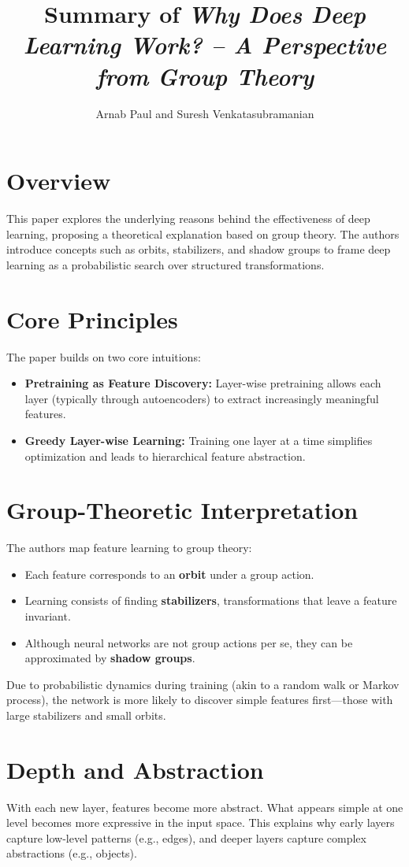 \documentclass[12pt]{article}
\title{Summary of \textit{Why Does Deep Learning Work? – A Perspective from Group Theory}}
\author{Arnab Paul and Suresh Venkatasubramanian}
\date{}
\begin{document}
\maketitle

\section*{Overview}
This paper explores the underlying reasons behind the effectiveness of deep learning, proposing a theoretical explanation based on group theory. 
The authors introduce concepts such as orbits, stabilizers, and shadow groups to frame deep learning as a probabilistic search over structured transformations.

\section*{Core Principles}
The paper builds on two core intuitions:
\begin{itemize}
    \item \textbf{Pretraining as Feature Discovery:} Layer-wise pretraining allows each layer (typically through autoencoders) to extract increasingly meaningful features.
    \item \textbf{Greedy Layer-wise Learning:} Training one layer at a time simplifies optimization and leads to hierarchical feature abstraction.
\end{itemize}

\section*{Group-Theoretic Interpretation}
The authors map feature learning to group theory:
\begin{itemize}
    \item Each feature corresponds to an \textbf{orbit} under a group action.
    \item Learning consists of finding \textbf{stabilizers}, transformations that leave a feature invariant.
    \item Although neural networks are not group actions per se, they can be approximated by \textbf{shadow groups}.
\end{itemize}
Due to probabilistic dynamics during training (akin to a random walk or Markov process), the network is more likely to discover simple features first—those with large stabilizers and small orbits.

\section*{Depth and Abstraction}
With each new layer, features become more abstract. What appears simple at one level becomes more expressive in the input space. This explains why early layers capture low-level patterns (e.g., edges), and deeper layers capture complex abstractions (e.g., objects).
\end{document}

